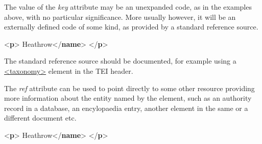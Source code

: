 The value of the {\itshape key} attribute may be an unexpanded code, as in the examples above, with no particular significance. More usually however, it will be an externally defined code of some kind, as provided by a standard reference source. \par\bgroup{}\exampleFont \begin{shaded}\noindent\mbox{}{<\textbf{p}>}\mbox{}\newline 
{}Heathrow{</\textbf{name}>}\mbox{}\newline 
{</\textbf{p}>}\end{shaded}\egroup\par \par
The standard reference source should be documented, for example using a \hyperref[TEI.taxonomy]{<taxonomy>} element in the TEI header.\par
The {\itshape ref} attribute can be used to point directly to some other resource providing more information about the entity named by the element, such as an authority record in a database, an encylopaedia entry, another element in the same or a different document etc. \par\bgroup{}\exampleFont \begin{shaded}\noindent\mbox{}{<\textbf{p}>}\mbox{}\newline 
{}Heathrow{</\textbf{name}>}\mbox{}\newline 
{</\textbf{p}>}\end{shaded}\egroup\par \par
